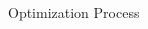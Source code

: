\documentclass{article}
\begin{document}
\begin{multicols}{2}
\begin{enumerate}
\begin{figure}[H]
                \caption{Optimization Process }
            \end{figure}
        \end{enumerate}
\end{multicols}
\end{document}
